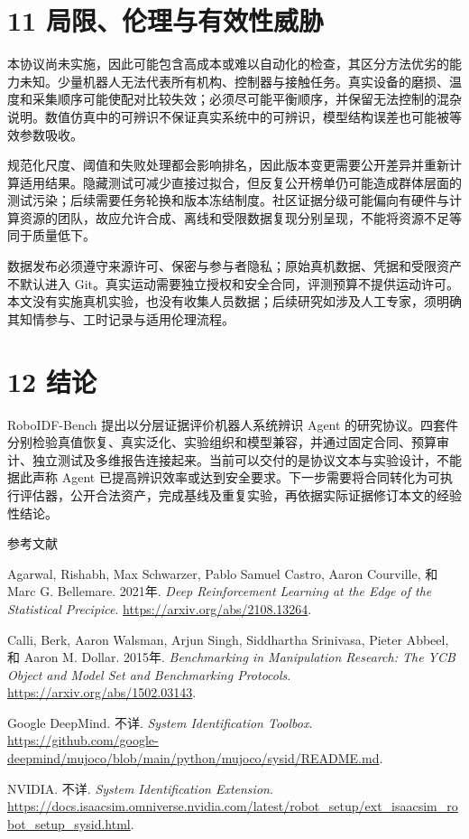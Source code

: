 \documentclass[
  chinese,
  11pt,
  a4paper,
  fontset=fandol]{ctexart}
\newlength{\cslhangindent}
\newenvironment{CSLReferences}[2] %
 {\begin{list}{}{%
  \setlength{\itemindent}{0pt}
  \setlength{\leftmargin}{0pt}
  \setlength{\parsep}{0pt}
  \ifodd #1
   \setlength{\leftmargin}{\cslhangindent}
   \setlength{\itemindent}{-1\cslhangindent}
  \fi
  \setlength{\itemsep}{#2\baselineskip}}}
 {\end{list}}
\begin{document}
\section{11
局限、伦理与有效性威胁}\label{ux5c40ux9650ux4f26ux7406ux4e0eux6709ux6548ux6027ux5a01ux80c1}

本协议尚未实施，因此可能包含高成本或难以自动化的检查，其区分方法优劣的能力未知。少量机器人无法代表所有机构、控制器与接触任务。真实设备的磨损、温度和采集顺序可能使配对比较失效；必须尽可能平衡顺序，并保留无法控制的混杂说明。数值仿真中的可辨识不保证真实系统中的可辨识，模型结构误差也可能被等效参数吸收。

规范化尺度、阈值和失败处理都会影响排名，因此版本变更需要公开差异并重新计算适用结果。隐藏测试可减少直接过拟合，但反复公开榜单仍可能造成群体层面的测试污染；后续需要任务轮换和版本冻结制度。社区证据分级可能偏向有硬件与计算资源的团队，故应允许合成、离线和受限数据复现分别呈现，不能将资源不足等同于质量低下。

数据发布必须遵守来源许可、保密与参与者隐私；原始真机数据、凭据和受限资产不默认进入
Git。真实运动需要独立授权和安全合同，评测预算不提供运动许可。本文没有实施真机实验，也没有收集人员数据；后续研究如涉及人工专家，须明确其知情参与、工时记录与适用伦理流程。

\section{12 结论}\label{ux7ed3ux8bba}

RoboIDF-Bench 提出以分层证据评价机器人系统辨识 Agent
的研究协议。四套件分别检验真值恢复、真实泛化、实验组织和模型兼容，并通过固定合同、预算审计、独立测试及多维报告连接起来。当前可以交付的是协议文本与实验设计，不能据此声称
Agent
已提高辨识效率或达到安全要求。下一步需要将合同转化为可执行评估器，公开合法资产，完成基线及重复实验，再依据实际证据修订本文的经验性结论。

参考文献

\protect{}\label{refs}
\begin{CSLReferences}{1}{1}
Agarwal, Rishabh, Max Schwarzer, Pablo Samuel Castro, Aaron Courville,
和 Marc G. Bellemare. 2021年. \emph{Deep Reinforcement Learning at the
Edge of the Statistical Precipice}.
\url{https://arxiv.org/abs/2108.13264}.

Calli, Berk, Aaron Walsman, Arjun Singh, Siddhartha Srinivasa, Pieter
Abbeel, 和 Aaron M. Dollar. 2015年. \emph{Benchmarking in Manipulation
Research: The YCB Object and Model Set and Benchmarking Protocols}.
\url{https://arxiv.org/abs/1502.03143}.

Google DeepMind. 不详. \emph{System Identification Toolbox}.
\url{https://github.com/google-deepmind/mujoco/blob/main/python/mujoco/sysid/README.md}.

NVIDIA. 不详. \emph{System Identification Extension}.
\url{https://docs.isaacsim.omniverse.nvidia.com/latest/robot_setup/ext_isaacsim_robot_setup_sysid.html}.

\end{CSLReferences}
\end{document}
